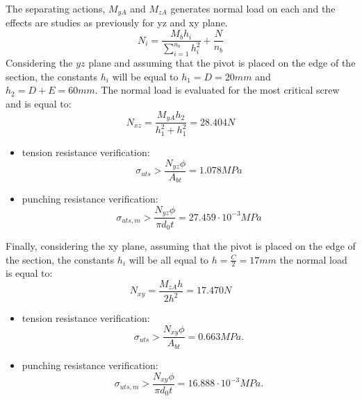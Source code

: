 The separating actions, $M_{yA}$ and $M_{zA}$ generates normal load on each and the effects are studies as previously for yz and xy plane.
\begin{equation*}
    N_{i} = \frac{M_{b}h_{i}}{\sum\limits_{i=1}^{n_{b}} h^2_{i}} + \frac{N}{n_{b}}
\end{equation*}
Considering the $yz$ plane and assuming that the pivot is placed on the edge of the section, the constants $h_{i}$ will be equal to $h_1 = D = 20 mm$ and $h_2 = D + E = 60 mm$.
The normal load is evaluated for the most critical screw and is equal to:
\begin{equation*}
    N_{xz} = \frac{M_{yA}h_{2}}{h_{1}^{2}+h_{1}^{2}} = 28.404 N
\end{equation*}
\begin{itemize}
    \item tension resistance verification:
     \begin{equation*}
       \sigma_{uts} > \frac{N_{yz}\phi}{A_{bt}} = 1.078 MPa
    \end{equation*}
    \item punching resistance verification:
     \begin{equation*}
       \sigma_{uts,m} > \frac{N_{yz}\phi}{\pi d_{0}t} = 27.459 \cdot 10^{-3} MPa
    \end{equation*}
\end{itemize}
Finally, considering the xy plane, assuming that the pivot is placed on the edge of the section, the constants $h_{i}$ will be all equal to $h = \frac{C}{2} = 17 mm$ the normal load is equal to: \\
\begin{equation*}
    N_{xy} = \frac{M_{zA}h}{2h^{2}} = 17.470 N
\end{equation*}
\begin{itemize}
    \item tension resistance verification:
     \begin{equation*}
       \sigma_{uts} > \frac{N_{xy}\phi}{A_{bt}} = 0.663 MPa.
    \end{equation*}
    \item punching resistance verification:
     \begin{equation*}
       \sigma_{uts,m} > \frac{N_{xy}\phi}{\pi d_{0}t} = 16.888 \cdot 10^{-3} MPa.
    \end{equation*}
\end{itemize}

